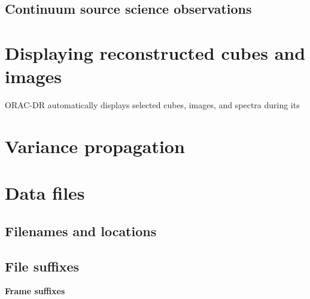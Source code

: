 \documentclass[twoside,11pt]{article}
\renewcommand{\_}{\texttt{\symbol{95}}}
\begin{document}
\subsection{Continuum source science observations}

\section{Displaying reconstructed cubes and images}

ORAC-DR automatically displays selected cubes, images, and spectra during its 

\section{Variance propagation}

\section{Data files}

\subsection{Filenames and locations}

\subsection{File suffixes}

\textbf{Frame suffixes}

\vspace{0.2cm}
\end{document}
